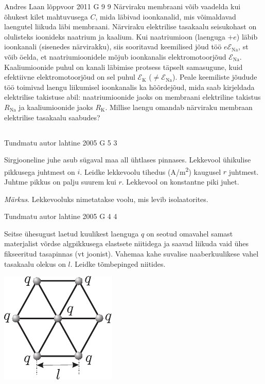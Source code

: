 \documentclass[11pt]{article}
\begin{document}
{%
{Andres Laan} %
{lõppvoor} %
{2011} %
{G 9} %
{9} %
{
\ifStatement
Närviraku membraani võib vaadelda kui õhukest kilet mahtuvusega $C$, mida läbivad ioonkanalid, mis võimaldavad laengutel liikuda läbi
membraani. Närviraku elektrilise tasakaalu seisukohast on olulisteks ioonideks
naatrium ja kaalium. Kui naatriumioon (laenguga $+e$) läbib ioonkanali (sisenedes närvirakku), siis sooritavad keemilised jõud töö $e\mathcal{E}_{\mathrm{Na}}$, st võib öelda, et
naatriumioonidele mõjub ioonkanalis elektromotoorjõud $\mathcal{E}_{\mathrm{Na}}$. Kaaliumioonide
puhul on kanali läbimise protsess täpselt samasugune, kuid efektiivne elektromotoorjõud on sel puhul $\mathcal{E}_{\mathrm{K}}$ ($\neq \mathcal{E}_{\mathrm{Na}}$). Peale keemiliste jõudude töö toimivad
laengu liikumisel ioonkanalis ka hõõrdejõud, mida saab kirjeldada elektrilise
takistuse abil: naatriumioonide jaoks on membraani elektriline takistus $R_{\mathrm{Na}}$ ja kaaliumioonide jaoks $R_{\mathrm{K}}$. Millise laengu omandab närviraku membraan
elektrilise tasakaalu saabudes? 
\fi
}
\newpage\subsection{\protect{}}

{Tundmatu autor} %
{lahtine} %
{2005} %
{G 5} %
{3} %
{
\ifStatement
Sirgjooneline juhe asub sügaval maa all ühtlases pinnases. Lekkevool ühikulise pikkusega juhtmest on $i$. Leidke lekkevoolu tihedus (\si{A/m^2}) kaugusel $r$ juhtmest. Juhtme pikkus on palju suurem kui $r$. Lekkevool on konstantne piki juhet.

\emph{Märkus}. Lekkevooluks nimetatakse voolu, mis levib isolaatorites. 
\fi
}

{Tundmatu autor} %
{lahtine} %
{2005} %
{G 4} %
{4} %
{
\ifStatement
Seitse ühesugust laetud kuulikest laenguga $q$ on seotud omavahel samast materjalist võrdse algpikkusega elastsete niitidega ja saavad liikuda vaid ühes fikseeritud tasapinnas (vt joonist). Vahemaa kahe suvalise naaberkuulikese vahel tasakaalu olekus on $l$. Leidke tõmbepinged niitides.

\begin{center}
	\includegraphics[width=0.35\linewidth]{2005-lahg-04-yl}
\end{center}
\fi
}

}
\end{document}
